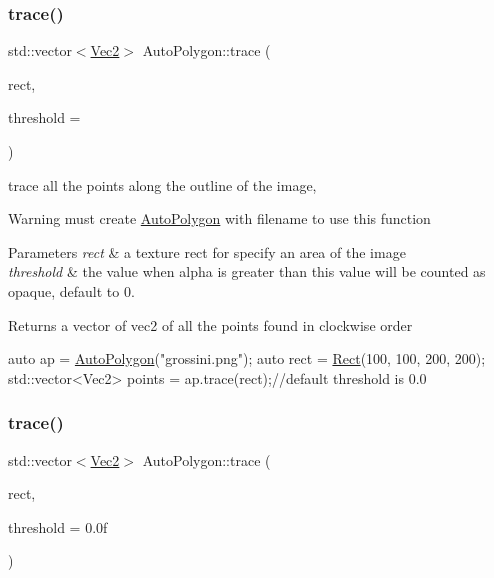 \subsubsection{\texorpdfstring{trace()}{trace()}\hspace{0.1cm}{\footnotesize\ttfamily [1/2]}}
{\footnotesize\ttfamily std\+::vector$<$\hyperlink{classVec2}{Vec2}$>$ Auto\+Polygon\+::trace (\begin{DoxyParamCaption}\item[{const cocos2d\+::\+Rect \&}]{rect,  }\item[{const float \&}]{threshold = {} }\end{DoxyParamCaption})}

trace all the points along the outline of the image, \begin{DoxyWarning}{Warning}
must create \hyperlink{classAutoPolygon}{Auto\+Polygon} with filename to use this function 
\end{DoxyWarning}

\begin{DoxyParams}{Parameters}
{\em rect} & a texture rect for specify an area of the image \\
\hline
{\em threshold} & the value when alpha is greater than this value will be counted as opaque, default to 0. \\
\hline
\end{DoxyParams}
\begin{DoxyReturn}{Returns}
a vector of vec2 of all the points found in clockwise order 
\begin{DoxyCode}
\textcolor{keyword}{auto} ap = \hyperlink{group____2d_gaa74351ac8f735344958e7b2ac8363bb5}{AutoPolygon}(\textcolor{stringliteral}{"grossini.png"});
\textcolor{keyword}{auto} rect = \hyperlink{classRect}{Rect}(100, 100, 200, 200);
std::vector<Vec2> points = ap.trace(rect);\textcolor{comment}{//default threshold is 0.0}
\end{DoxyCode}
 
\end{DoxyReturn}
\mbox{\label{group____2d_gaac8f745760eabe0b1bfeff151b84f1f3}} 
\subsubsection{\texorpdfstring{trace()}{trace()}\hspace{0.1cm}{\footnotesize\ttfamily [2/2]}}
{\footnotesize\ttfamily std\+::vector$<$\hyperlink{classVec2}{Vec2}$>$ Auto\+Polygon\+::trace (\begin{DoxyParamCaption}\item[{const cocos2d\+::\+Rect \&}]{rect,  }\item[{float}]{threshold = {\ttfamily 0.0f} }\end{DoxyParamCaption})}

